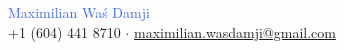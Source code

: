 \documentclass[11pt]{article}
\newcommand{\headinginline}[2]{
    \begin{minipage}[t]{0.55\textwidth}
    \vspace*{\fill}
    #1
    \end{minipage}
    \begin{minipage}[t]{0.45\textwidth}
    \begin{flushright}
    \vspace*{\fill}
    \vspace{8px}
    #2
    \end{flushright}
    \end{minipage}
}
\newcommand{\github}[1]{\href{https://github.com/#1/}{github.com/#1}}
\newcommand{\email}[1]{\href{mailto:#1}{#1}}
\newcommand{\linkedin}[1]{\href{https://www.linkedin.com/in/#1/}{#1}}
\begin{document}

\begin{center}
    {
        \Huge
        \textcolor{RoyalBlue}{Maximilian Waś Damji} \\
    }
    \faPhone{}
    +1 (604) 441 8710 $\cdot$
    \faEnvelope{}
    \email{maximilian.wasdamji@gmail.com}
\end{center}






\end{document}
